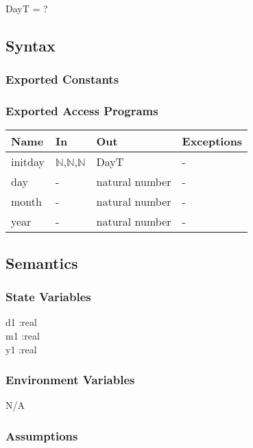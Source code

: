\documentclass[12pt, titlepage]{article}
\begin{document}
DayT = ?\\

\subsection{Syntax}

\subsubsection{Exported Constants}


\subsubsection{Exported Access Programs}

\begin{center}
\begin{tabular}{p{2cm} p{4cm} p{4cm} p{2cm}}
\hline
\textbf{Name} & \textbf{In} & \textbf{Out} & \textbf{Exceptions} \\
\hline
initday&  $\mathbb{N}$,$\mathbb{N}$,$\mathbb{N}$  & DayT & - \\
day &  -  & natural number & - \\
month &  -  & natural number & - \\
year &  -  & natural number & - \\

\hline
\end{tabular}
\end{center}


\subsection{Semantics}

\subsubsection{State Variables}
d1 :real \\
m1 :real \\
y1 :real \\

\subsubsection{Environment Variables}

N/A\\

\subsubsection{Assumptions}
\end{document}
